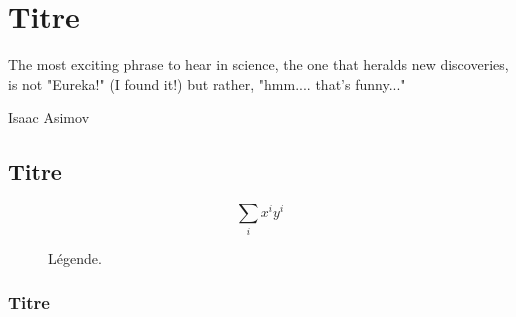 \chapter{Titre}
\label{chap:lab1}

\epigraph{The most exciting phrase to hear in science, the one that heralds new
  discoveries, is not "Eureka!" (I found it!) but rather, "hmm.... that's
  funny..."}{Isaac Asimov}

\minitoc %


\section[Titre dans le sommaire]{Titre}

\lipsum[1-1]

$$\sum_i x^i y^i$$

\lipsum[2-2]

\begin{figure}[H]
  \centering

  

  \caption{Légende.}
  \label{fig:tag}
\end{figure}

\subsection{Titre}

\lipsum[3-3]

